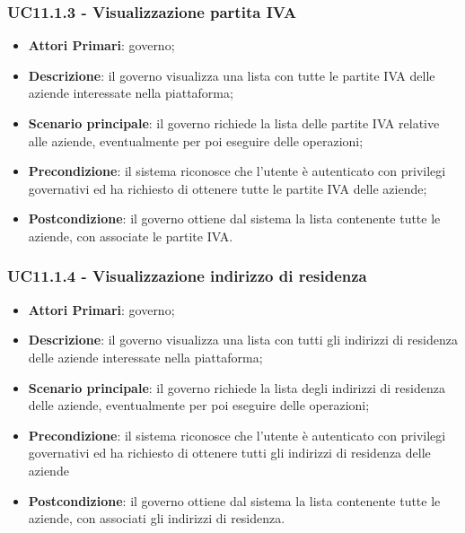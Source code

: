 \subsubsection{UC11.1.3 - Visualizzazione partita IVA}
\begin{itemize}
	\item \textbf{Attori Primari}: governo;
	\item \textbf{Descrizione}: il governo visualizza una lista con tutte le partite IVA delle aziende interessate nella piattaforma;
	\item \textbf{Scenario principale}: il governo richiede la lista delle partite IVA relative alle aziende, eventualmente per poi eseguire delle operazioni;
	\item \textbf{Precondizione}: il sistema riconosce che l'utente è autenticato con privilegi governativi ed ha richiesto di ottenere tutte le partite IVA delle aziende;
	\item \textbf{Postcondizione}: il governo ottiene dal sistema la lista contenente tutte le aziende, con associate le partite IVA.
\end{itemize}
\subsubsection{UC11.1.4 - Visualizzazione indirizzo di residenza}
\begin{itemize}
	\item \textbf{Attori Primari}: governo;
	\item \textbf{Descrizione}: il governo visualizza una lista con tutti gli indirizzi di residenza delle aziende interessate nella piattaforma;
	\item \textbf{Scenario principale}: il governo richiede la lista degli indirizzi di residenza delle aziende, eventualmente per poi eseguire delle operazioni;
	\item \textbf{Precondizione}: il sistema riconosce che l'utente è autenticato con privilegi governativi ed ha richiesto di ottenere tutti gli indirizzi di residenza delle aziende
	\item \textbf{Postcondizione}: il governo ottiene dal sistema la lista contenente tutte le aziende, con associati gli indirizzi di residenza.
\end{itemize}

